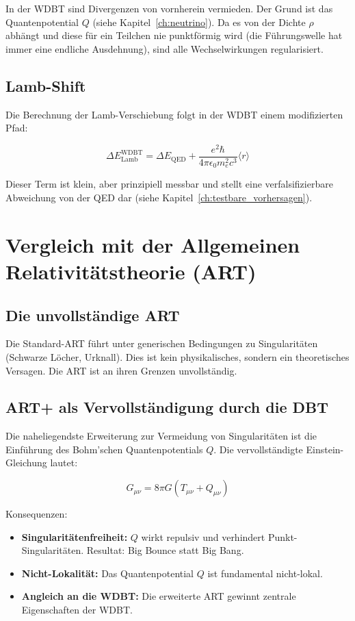 In der WDBT sind Divergenzen von vornherein vermieden. Der Grund ist das Quantenpotential \( Q \) (siehe Kapitel~\ref{ch:neutrino}). Da es von der Dichte \( \rho \) abhängt und diese für ein Teilchen nie punktförmig wird (die Führungswelle hat immer eine endliche Ausdehnung), sind alle Wechselwirkungen regularisiert.

\subsection{Lamb-Shift}
\label{sub:vergleich_qed_lamb}

Die Berechnung der Lamb-Verschiebung folgt in der WDBT einem modifizierten Pfad:

\[
\Delta E_{\text{Lamb}}^{\text{WDBT}} = \Delta E_{\text{QED}} + \frac{e^2\hbar}{4\pi\epsilon_0 m_e^2 c^3} \langle r \rangle
\]

Dieser Term ist klein, aber prinzipiell messbar und stellt eine verfalsifizierbare Abweichung von der QED dar (siehe Kapitel~\ref{ch:testbare_vorhersagen}).

\section{Vergleich mit der Allgemeinen Relativitätstheorie (ART)}
\label{app:vergleich_art_details}

\subsection{Die unvollständige ART}
\label{sub:vergleich_art_unvollstaendig}

Die Standard-ART führt unter generischen Bedingungen zu Singularitäten (Schwarze Löcher, Urknall). Dies ist kein physikalisches, sondern ein theoretisches Versagen. Die ART ist an ihren Grenzen unvollständig.

\subsection{ART+ als Vervollständigung durch die DBT}
\label{sub:vergleich_art_plus}

Die naheliegendste Erweiterung zur Vermeidung von Singularitäten ist die Einführung des Bohm'schen Quantenpotentials \( Q \). Die vervollständigte Einstein-Gleichung lautet:

\[
G_{\mu\nu} = 8\pi G (T_{\mu\nu} + Q_{\mu\nu})
\]

Konsequenzen:

\begin{itemize}
    \item \textbf{Singularitätenfreiheit:} \( Q \) wirkt repulsiv und verhindert Punkt-Singularitäten. Resultat: Big Bounce statt Big Bang.
    \item \textbf{Nicht-Lokalität:} Das Quantenpotential \( Q \) ist fundamental nicht-lokal.
    \item \textbf{Angleich an die WDBT:} Die erweiterte ART gewinnt zentrale Eigenschaften der WDBT.
\end{itemize}

